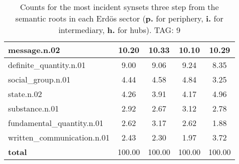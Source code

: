 \begin{table}[h!]
\begin{center}
\begin{tabular}{| l || c | c | c | c |}
message.n.02 & 10.20  & 10.33  & 10.10  & 10.29 \\\hline
definite\_quantity.n.01 & 9.00  & 9.06  & 9.24  & 8.35 \\\hline
social\_group.n.01 & 4.44  & 4.58  & 4.84  & 3.25 \\\hline
state.n.02 & 4.26  & 3.91  & 4.17  & 4.96 \\\hline
substance.n.01 & 2.92  & 2.67  & 3.12  & 2.78 \\\hline
fundamental\_quantity.n.01 & 2.62  & 3.17  & 2.62  & 1.88 \\\hline
written\_communication.n.01 & 2.43  & 2.30  & 1.97  & 3.72 \\\hline\hline
{{\bf total}} & 100.00  & 100.00  & 100.00  & 100.00 \\\hline
\end{tabular}
\caption{Counts for the most incident synsets three step from the semantic roots in each Erd\"os sector ({\bf p.} for periphery, {\bf i.} for intermediary, {\bf h.} for hubs). TAG: 9}
\end{center}
\end{table}